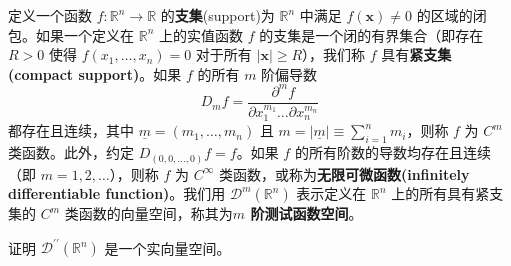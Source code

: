 定义一个函数 $f: \mathbb{R}^n \rightarrow \mathbb{R}$
的\textbf{支集}(support)为 $\mathbb{R}^n$ 中满足
$f(\mathbf{x}) \neq 0$ 的区域的闭包。如果一个定义在 $\mathbb{R}^n$
上的实值函数 $f$ 的支集是一个闭的有界集合（即存在 $R>0$ 使得
$f(x_1, \ldots, x_n)=0$ 对于所有 $|\mathbf{x}| \geq R$），我们称
$f$ 具有\textbf{紧支集(compact support)}。如果 $f$ 的所有 $m$
阶偏导数
 $$
D_m f = \frac{\partial^m f}{\partial x_1^{m_1} \ldots \partial x_n^{m_n}}
$$
都存在且连续，其中 $\underline{m} = (m_1, \ldots, m_n)$ 且
$m = |\underline{m}| \equiv \sum_{i=1}^n m_i$，则称 $f$ 为 $C^m$
类函数。此外，约定 $D_{(0,0,\ldots,0)} f = f$。如果 $f$
的所有阶数的导数均存在且连续（即 $m = 1, 2, \ldots$），则称 $f$ 为
$C^{\infty}$ 类函数，或称为\textbf{无限可微函数(infinitely
differentiable function)}。我们用 $\mathcal{D}^m(\mathbb{R}^n)$
表示定义在 $\mathbb{R}^n$ 上的所有具有紧支集的 $C^m$
类函数的向量空间，称其为\textbf{$m$ 阶测试函数空间}。
\begin{exercise}
  证明 $\mathcal{D}^{\prime \prime}(\mathbb{R}^n)$ 是一个实向量空间。
\end{exercise}

